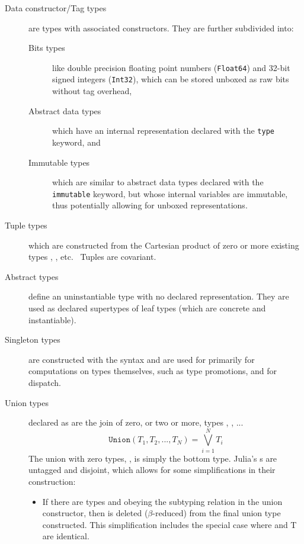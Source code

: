 \documentclass[pldi]{sigplanconf-pldi15}
\begin{document}
\begin{description}

\item[Data constructor/Tag types] are types with associated constructors. They
	are further subdivided into:
	\begin{description}
	
	\item[Bits types] like double precision floating point numbers
	(\verb|Float64|) and 32-bit signed integers (\verb|Int32|), which can
	be stored unboxed as raw bits without tag overhead,

	\item[Abstract data types] which have an internal representation
		declared with the \verb|type| keyword, and
		
	\item[Immutable types] which are similar to abstract data types
		declared with the \verb|immutable| keyword, but whose internal
		variables are immutable, thus potentially allowing for unboxed
		representations.

	\end{description}


\item[Tuple types]  which are constructed from the Cartesian
	product of zero or more existing types , ,
	etc.~\cite[Sec. 11.7]{Pierce2002} Tuples are covariant.

\item[Abstract types] define an uninstantiable type with no declared
	representation. They are used as declared supertypes of leaf types
	(which are concrete and instantiable).

\item[Singleton types] are constructed with the  syntax and
	are used for primarily for computations on types themselves, such as
	type promotions, and for dispatch. 

\item[Union types] declared as  are the join of zero,
	or two or more, types , , ...~\cite[Sec.
	15.7]{Pierce2002}
	\begin{equation}
		\texttt{Union}(T_1, T_2, ..., T_N) = \bigvee_{i=1}^N T_i 
	\end{equation}
	The union with zero types, , is simply the bottom type.
	Julia's s are untagged and disjoint, which allows for some
	simplifications in their construction:
	\begin{itemize}
		\item If there are types  and  obeying the
			subtyping relation  in the union
			constructor, then  is deleted ($\beta$-reduced)
			from the final union type constructed. This
			simplification includes the special case where 
			and \code T are identical.


\end{itemize}
\end{description}
\end{document}
